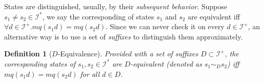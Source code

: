 \documentclass[conference, a4paper]{IEEEtran}
\newtheorem{definition}{Definition}
\begin{document}
States are distinguished, usually, by their \emph{subsequent behavior}. Suppose $s_1\neq s_2\in
\mathcal{I}^*$, we say the corresponding of states $s_1$ and $s_2$ are equivalent iff $\forall d\in
\mathcal{I}^+. mq(s_1d)=mq(s_2d)$. Since we can never check it on every $d\in\mathcal{I}^+$, an
alternative way is to use a set of \emph{suffixes} to distinguish them approximately.
\begin{definition}[$D$-Equivalence]
  Provided with a set of suffixes $D\subset\mathcal{I}^+$, the corresponding states of
  $s_1,s_2\in\mathcal{I}^*$ are $D$-equivalent (denoted as $s_1\sim_D s_2$)
  iff $mq(s_1d) = mq(s_2d)$ for all $d\in D$.
\end{definition}




    
\end{document}
